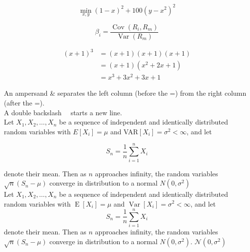 \documentclass[12pt,a4paper]{article}
\begin{document}
\begin{equation*} %
\min_{x,y}{(1-x)^2 + 100(y-x^2)^2}
\end{equation*}



\begin{equation*}
\beta_i =
\frac{\operatorname{Cov}(R_i, R_m)}
{\operatorname{Var}(R_m)}
\end{equation*}



\begin{align*}
(x+1)^3 &= (x+1)(x+1)(x+1) \\
&= (x+1)(x^2 + 2x + 1) \\
&= x^3 + 3x^2 + 3x + 1
\end{align*}


An ampersand \& separates the left column (before the =) from the right column (after the =). \\[6pt]
 A double backslash \ \ starts a new line.\\[6pt]

Let $ X_1, X_2,  \ldots, X_n $ be a sequence of independent and identically distributed random variables with $ E[X_i] = \mu $ and VAR$[X_i] = \sigma ^2 < \infty $, and let

\begin{equation*}
S_n = \frac{1}{n} \sum_{i=1}^{n} X_i
\end{equation*}

denote their mean. Then as $n$ approaches infinity, the random variables $ \sqrt{n} (S_n - \mu) $ converge in distribution to a normal $ N(0, \sigma ^2)$ \\[6pt]


Let $X_1, X_2, \ldots, X_n$ be a sequence of independent and identically distributed random variables with
$\operatorname{E}[X_i] = \mu$ and
$\operatorname{Var}[X_i] = \sigma^2 < \infty$, and let
\begin{equation*}
S_n = \frac{1}{n}\sum_{i=1}^{n} X_i
\end{equation*}
denote their mean. Then as $n$ approaches infinity, the random variables $\sqrt{n}(S_n - \mu)$ converge in distribution to a normal $N(0, \sigma^2)$. $\mathcal{N}(0, \sigma^2)$ \\[6pt]

\end{document}
